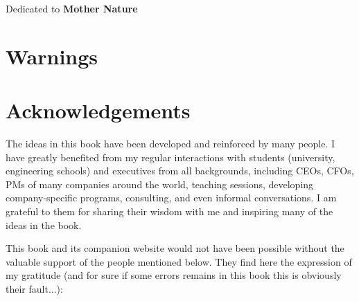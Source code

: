 \documentclass[12pt,a4paper,twoside,openright]{report}
\theoremstyle{definition}
\theoremstyle{itexmp}
\numberwithin{equation}{section}
\newenvironment{dedication}
  {\clearpage           %
   \thispagestyle{empty}%
   \vspace*{\stretch{1}}%
   \itshape             %
   \raggedleft          %
  }
  {\par %
   \vspace{\stretch{3}} %
   \clearpage           %
  }
\begin{document}
	\begin{dedication}
	{\LARGE Dedicated to \textbf{Mother Nature}}
	\end{dedication}

	\chapter{Warnings}
	\minitoc
	
	
	
	\chapter{Acknowledgements}

	The ideas in this book have been developed and reinforced by many people. I have greatly benefited from my regular interactions with  students (university, engineering schools) and executives from all backgrounds, including CEOs, CFOs, PMs of many companies around the world, teaching sessions, developing company-specific programs, consulting, and even informal conversations. I am grateful to them for sharing their wisdom with me and inspiring many of the ideas in the book.

	This book and its companion website would not have been possible without the valuable support of the people mentioned below. They find here the expression of my gratitude (and for sure if some errors remains in this book this is obviously their fault...):
	
\end{document}
